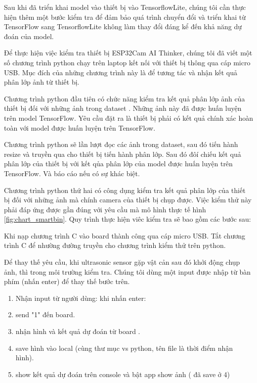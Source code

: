 Sau khi đã triển khai model vào thiết bị vào TensorflowLite, chúng tôi cần thực hiện thêm một bước kiểm tra để đảm bảo quá trình chuyển đổi và triển khai từ TensorFlow sang TensorflowLite không làm thay đổi đáng kể đến khả năng dự đoán của model.

Để thực hiện việc kiểm tra thiết bị ESP32Cam AI Thinker, chúng tôi đã viết một số chương trình python chạy trên laptop kết nối với thiết bị thông qua cáp micro USB. Mục đích của những chương trình này là để tương tác và nhận kết quả phân lớp ảnh từ thiết bị.

Chương trình python đầu tiên có chức năng kiểm tra kết quả phân lớp ảnh của thiết bị đối với những ảnh trong dataset \cite{trashnet}. Những ảnh này đã được huấn luyện trên model TensorFlow. Yêu cầu đặt ra là thiết bị phải có kết quả chính xác hoàn toàn với model được huấn luyện trên TensorFlow.

Chương trình python sẽ lần lượt đọc các ảnh trong dataset, sau đó tiến hành resize và truyền qua cho thiết bị tiến hành phân lớp. Sau đó đôí chiếu kết quả phân lớp của thiết bị với kết qủa phân lớp của model được huấn luyện trên TensorFlow. Và báo cáo nếu có sự khác biệt.

Chương trình python thứ hai có công dụng kiểm tra kết quả phân lớp của thiết bị đối với những ảnh mà chính camera của thiết bị chụp được. Việc kiểm thử này phải đáp ứng được gần đúng với yêu cầu mà mô hình thực tế hình \ref{fig:chart_smartbin}. Quy trình thực hiện viêc kiểm tra sẽ bao gồm các bước sau:

Khi nạp chương trình C vào board thành công qua cáp micro USB. Tắt chương trình C để nhường đường truyền cho chương trình kiểm thử trên python.

Để thay thế yêu cầu, khi ultrasonic sensor gặp vật cản sau đó khởi động chụp ảnh, thì trong môi trường kiểm tra. Chúng tôi dùng một input được nhập từ bàn phím (nhấn enter) để thay thế bước trên. 
\begin{enumerate}
    \item Nhận input từ người dùng: khi nhấn enter: 
    \item send "1" đến board.
    \item nhận hình và kết quả dự đoán từ board .
    \item save hình vào local (cùng thư mục vs python, tên file là thời điểm nhận hình).
    \item show kết quả dự đoán trên console và bật app show ảnh ( đã save ở 4)
\end{enumerate}

